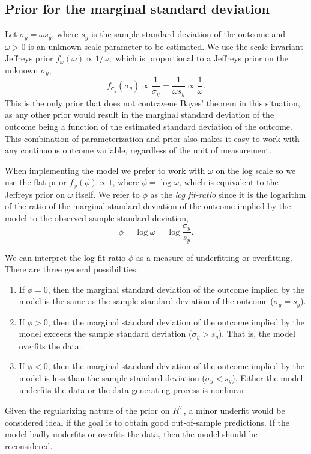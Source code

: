 \documentclass[11pt]{article}
\newcommand{\Rsq}{$R^2\,$}
\begin{document}
\subsection{Prior for the marginal standard deviation}
\label{subsec:marginalSD}
Let $\sigma_y = \omega s_y$, where $s_y$ is the sample standard deviation of the
outcome and $\omega > 0$ is an unknown scale parameter to be estimated. We use
the scale-invariant Jeffreys prior
$f_\omega \left(\omega\right) \propto 1 / \omega,$
which is proportional to a Jeffreys prior on the unknown $\sigma_y$,
$$f_{\sigma_y} \left(\sigma_y\right) \propto \frac{1}{\sigma_y}
= \frac{1}{\omega s_y} \propto \frac{1}{\omega}.$$
This is the only prior that does not contravene Bayes' theorem in this
situation, as any other prior would result in the marginal standard deviation of
the outcome being a function of the estimated standard deviation of the outcome.
This combination of parameterization and prior also makes it easy to work with
any continuous outcome variable, regardless of the unit of measurement.

When implementing the model we prefer to work with $\omega$ on the log scale
so we use the flat prior $f_\phi(\phi) \propto 1$, where $\phi =
\log{\omega}$, which is equivalent to the Jeffreys prior on $\omega$ itself. We
refer to $\phi$ as the \emph{log fit-ratio} since it is the logarithm of the
ratio of the marginal standard deviation of the outcome implied by the model to
the observed sample standard deviation,
%
$$\phi = \log{\omega} = \log{\frac{\sigma_y}{s_y}}.$$

We can interpret the log fit-ratio $\phi$ as a measure of underfitting or
overfitting. There are three general possibilities:

\begin{enumerate}
\item If $\phi = 0$, then the marginal standard deviation of
the outcome implied by the model is the same as the sample standard deviation of
the outcome  ($\sigma_y = s_y$).
\item If $\phi > 0$, then the marginal standard deviation of the outcome implied
by the model exceeds the sample standard deviation ($\sigma_y > s_y$). That is,
the model overfits the data.
\item If $\phi < 0$, then the marginal standard deviation of the outcome implied
by the model is less than the sample standard deviation  ($\sigma_y < s_y$).
Either the model underfits the data or the data generating process is nonlinear.
\end{enumerate}
%
Given the regularizing nature of the prior on \Rsq, a minor underfit would be
considered ideal if the goal is to obtain good out-of-sample predictions. If the
model badly underfits or overfits the data, then the model should be
reconsidered.
\end{document}
